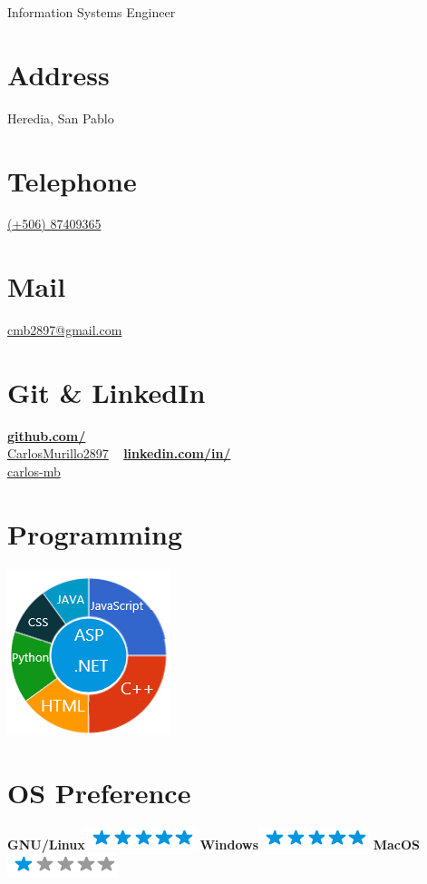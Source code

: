 \documentclass[]{friggeri-cv}
\begin{document}
      {Information Systems Engineer}
      

\begin{aside}
  \section{Address}
    Heredia, San Pablo
    ~
  \section{Telephone}%
    \href{tel:87409365}{(+506) 87409365}
    ~
  \section{Mail}
    \href{mailto:cmb2897@gmail.com}{cmb2897@gmail.com}
    ~
  \section{Git \& LinkedIn}
    \href{https://github.com/CarlosMurillo2897/}{\textbf{github.com/}\\CarlosMurillo2897}
    ~
    \href{https://www.linkedin.com/in/carlos-mb/}{\textbf{linkedin.com/in/}\\carlos-mb}
    ~
  \section{Programming}
    \includegraphics[scale=0.62]{img/Languages.png}
    ~
  \section{OS Preference}
    \textbf{GNU/Linux}\includegraphics[scale=0.40]{img/5stars.png}
    \textbf{Windows}\includegraphics[scale=0.40]{img/5stars.png}
    \textbf{MacOS}\includegraphics[scale=0.40]{img/1stars.png}
    ~

\end{aside}
\end{document}
